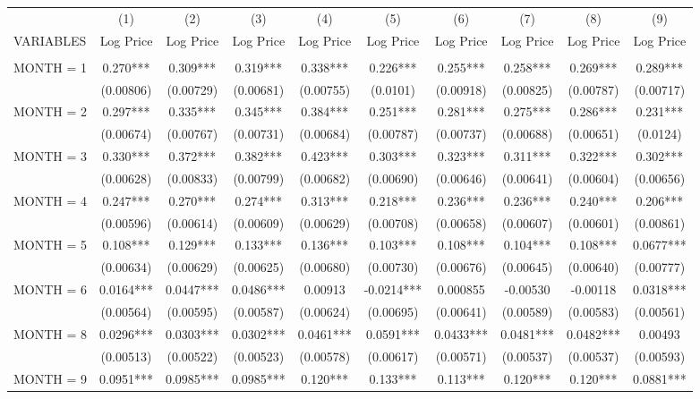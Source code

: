 \begin{tabular}{lccccccccc} \hline
 & (1) & (2) & (3) & (4) & (5) & (6) & (7) & (8) & (9) \\
VARIABLES & Log Price & Log Price & Log Price & Log Price & Log Price & Log Price & Log Price & Log Price & Log Price \\ \hline
 &  &  &  &  &  &  &  &  &  \\
MONTH = 1 & 0.270*** & 0.309*** & 0.319*** & 0.338*** & 0.226*** & 0.255*** & 0.258*** & 0.269*** & 0.289*** \\
 & (0.00806) & (0.00729) & (0.00681) & (0.00755) & (0.0101) & (0.00918) & (0.00825) & (0.00787) & (0.00717) \\
MONTH = 2 & 0.297*** & 0.335*** & 0.345*** & 0.384*** & 0.251*** & 0.281*** & 0.275*** & 0.286*** & 0.231*** \\
 & (0.00674) & (0.00767) & (0.00731) & (0.00684) & (0.00787) & (0.00737) & (0.00688) & (0.00651) & (0.0124) \\
MONTH = 3 & 0.330*** & 0.372*** & 0.382*** & 0.423*** & 0.303*** & 0.323*** & 0.311*** & 0.322*** & 0.302*** \\
 & (0.00628) & (0.00833) & (0.00799) & (0.00682) & (0.00690) & (0.00646) & (0.00641) & (0.00604) & (0.00656) \\
MONTH = 4 & 0.247*** & 0.270*** & 0.274*** & 0.313*** & 0.218*** & 0.236*** & 0.236*** & 0.240*** & 0.206*** \\
 & (0.00596) & (0.00614) & (0.00609) & (0.00629) & (0.00708) & (0.00658) & (0.00607) & (0.00601) & (0.00861) \\
MONTH = 5 & 0.108*** & 0.129*** & 0.133*** & 0.136*** & 0.103*** & 0.108*** & 0.104*** & 0.108*** & 0.0677*** \\
 & (0.00634) & (0.00629) & (0.00625) & (0.00680) & (0.00730) & (0.00676) & (0.00645) & (0.00640) & (0.00777) \\
MONTH = 6 & 0.0164*** & 0.0447*** & 0.0486*** & 0.00913 & -0.0214*** & 0.000855 & -0.00530 & -0.00118 & 0.0318*** \\
 & (0.00564) & (0.00595) & (0.00587) & (0.00624) & (0.00695) & (0.00641) & (0.00589) & (0.00583) & (0.00561) \\
MONTH = 8 & 0.0296*** & 0.0303*** & 0.0302*** & 0.0461*** & 0.0591*** & 0.0433*** & 0.0481*** & 0.0482*** & 0.00493 \\
 & (0.00513) & (0.00522) & (0.00523) & (0.00578) & (0.00617) & (0.00571) & (0.00537) & (0.00537) & (0.00593) \\
MONTH = 9 & 0.0951*** & 0.0985*** & 0.0985*** & 0.120*** & 0.133*** & 0.113*** & 0.120*** & 0.120*** & 0.0881*** \\

\end{tabular}
